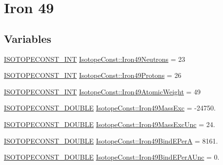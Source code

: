 \hypertarget{group___isotope_const-_iron-_fe49}{}\section{Iron 49}
\label{group___isotope_const-_iron-_fe49}
\subsection*{Variables}
\begin{DoxyCompactItemize}
\item 
\mbox{\hyperlink{group___isotope_const-_macros_ga5f18360b3e99483a35c32d789e62621c}{I\+S\+O\+T\+O\+P\+E\+C\+O\+N\+S\+T\+\_\+\+I\+NT}} \mbox{\hyperlink{group___isotope_const-_iron-_fe49_ga89673ac58adbe4cdfc22e4487fe4104b}{Isotope\+Const\+::\+Iron49\+Neutrons}} = 23
\item 
\mbox{\hyperlink{group___isotope_const-_macros_ga5f18360b3e99483a35c32d789e62621c}{I\+S\+O\+T\+O\+P\+E\+C\+O\+N\+S\+T\+\_\+\+I\+NT}} \mbox{\hyperlink{group___isotope_const-_iron-_fe49_ga0cec6b4431b8ff82c9ce6ce1d24d5a04}{Isotope\+Const\+::\+Iron49\+Protons}} = 26
\item 
\mbox{\hyperlink{group___isotope_const-_macros_ga5f18360b3e99483a35c32d789e62621c}{I\+S\+O\+T\+O\+P\+E\+C\+O\+N\+S\+T\+\_\+\+I\+NT}} \mbox{\hyperlink{group___isotope_const-_iron-_fe49_ga43b7e435c8c1820656c130ff3759808c}{Isotope\+Const\+::\+Iron49\+Atomic\+Weight}} = 49
\item 
\mbox{\hyperlink{group___isotope_const-_macros_ga8f45a7272ce02c0b4c65c44636ed719a}{I\+S\+O\+T\+O\+P\+E\+C\+O\+N\+S\+T\+\_\+\+D\+O\+U\+B\+LE}} \mbox{\hyperlink{group___isotope_const-_iron-_fe49_gaa926a2e2c8ab7373da13412c46ec771d}{Isotope\+Const\+::\+Iron49\+Mass\+Exc}} = -\/24750.
\item 
\mbox{\hyperlink{group___isotope_const-_macros_ga8f45a7272ce02c0b4c65c44636ed719a}{I\+S\+O\+T\+O\+P\+E\+C\+O\+N\+S\+T\+\_\+\+D\+O\+U\+B\+LE}} \mbox{\hyperlink{group___isotope_const-_iron-_fe49_ga377b986e5dadf38ce169534e44e2fc92}{Isotope\+Const\+::\+Iron49\+Mass\+Exc\+Unc}} = 24.
\item 
\mbox{\hyperlink{group___isotope_const-_macros_ga8f45a7272ce02c0b4c65c44636ed719a}{I\+S\+O\+T\+O\+P\+E\+C\+O\+N\+S\+T\+\_\+\+D\+O\+U\+B\+LE}} \mbox{\hyperlink{group___isotope_const-_iron-_fe49_gae2207adcca731ecf60dcbac955a1ff12}{Isotope\+Const\+::\+Iron49\+Bind\+E\+PerA}} = 8161.
\item 
\mbox{\hyperlink{group___isotope_const-_macros_ga8f45a7272ce02c0b4c65c44636ed719a}{I\+S\+O\+T\+O\+P\+E\+C\+O\+N\+S\+T\+\_\+\+D\+O\+U\+B\+LE}} \mbox{\hyperlink{group___isotope_const-_iron-_fe49_ga6de3b3578cb163bcfa0bc1f3925f4767}{Isotope\+Const\+::\+Iron49\+Bind\+E\+Per\+A\+Unc}} = 0.

\end{DoxyCompactItemize}
